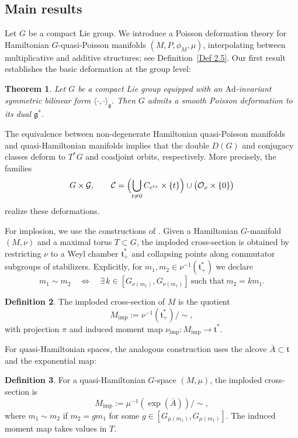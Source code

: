 \documentclass[reqno]{amsart}
\theoremstyle{plain}
\newtheorem{Thm}{Theorem}[section]
\theoremstyle{definition}
\newtheorem{Def}[Thm]{Definition}
\newcommand{\G}{\mathcal{G}}
\begin{document}
\subsection{Main results}

Let $G$ be a compact Lie group. We introduce a Poisson deformation theory for Hamiltonian $G$-quasi-Poisson manifolds $(M,P,\phi_M,\mu)$, interpolating between multiplicative and additive structures; see Definition~\ref{Def 2.5}. Our first result establishes the basic deformation at the group level:

\begin{Thm}\label{Thm 1.1}
Let $G$ be a compact Lie group equipped with an $\mathrm{Ad}$-invariant symmetric bilinear form $\langle\cdot,\cdot\rangle_{\mathfrak{g}}$. Then $G$ admits a smooth Poisson deformation to its dual $\mathfrak{g}^*$.
\end{Thm}

The equivalence between non-degenerate Hamiltonian quasi-Poisson manifolds and quasi-Hamiltonian manifolds \cite[Theorem~9.3]{alekseev2002quasi} implies that the double $D(G)$ and conjugacy classes deform to $T^*G$ and coadjoint orbits, respectively. More precisely, the families
\[
G\times \G, \qquad 
\mathcal{C}=\Bigl(\bigcup_{t\neq 0} C_{e^{tx}}\times\{t\}\Bigr)\cup\bigl(\mathcal{O}_x\times\{0\}\bigr)
\]
realize these deformations.

For implosion, we use the constructions of \cite{guillemin2002, hurtubise2006group}. Given a Hamiltonian $G$-manifold $(M,\nu)$ and a maximal torus $T\subset G$, the imploded cross-section is obtained by restricting $\nu$ to a Weyl chamber $\mathfrak{t}_+^*$ and collapsing points along commutator subgroups of stabilizers. Explicitly, for $m_1,m_2\in\nu^{-1}(\mathfrak{t}_+^*)$ we declare
\[
m_1\sim m_2 \quad\Longleftrightarrow\quad 
\exists\,k\in [G_{\nu(m_1)},G_{\nu(m_1)}]\ \text{such that}\ m_2=k m_1.
\]

\begin{Def}\cite[Definition~2.1]{guillemin2002}
The imploded cross-section of $M$ is the quotient
\[
M_{\mathrm{imp}}:=\nu^{-1}(\mathfrak{t}_+^*)/\!\sim,
\]
with projection $\pi$ and induced moment map $\nu_{\mathrm{imp}}:M_{\mathrm{imp}}\to\mathfrak{t}^*$.
\end{Def}

For quasi-Hamiltonian spaces, the analogous construction uses the alcove $\bar{A}\subset\mathfrak{t}$ and the exponential map:

\begin{Def}\cite[Definition~3.2]{hurtubise2006group}
For a quasi-Hamiltonian $G$-space $(M,\mu)$, the imploded cross-section is
\[
M_{\mathrm{imp}}:=\mu^{-1}(\exp(\bar{A}))/\!\sim,
\]
where $m_1\sim m_2$ if $m_2=g m_1$ for some $g\in [G_{\mu(m_1)},G_{\mu(m_1)}]$. The induced moment map takes values in $T$.
\end{Def}
\end{document}
